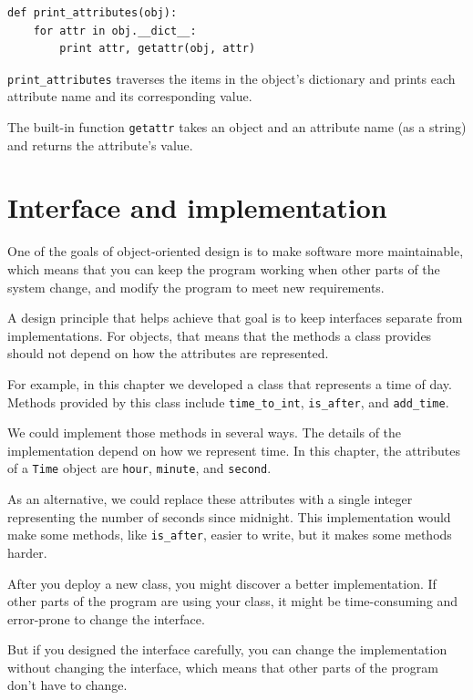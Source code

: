 \documentclass[10pt]{book}
\begin{document}
\begin{verbatim}
def print_attributes(obj):
    for attr in obj.__dict__:
        print attr, getattr(obj, attr)
\end{verbatim}
%
\verb"print_attributes" traverses the items in the object's dictionary
and prints each attribute name and its corresponding value.

The built-in function {\tt getattr} takes an object and an attribute
name (as a string) and returns the attribute's value.


\section{Interface and implementation}

One of the goals of object-oriented design is to make software more
maintainable, which means that you can keep the program working when
other parts of the system change, and modify the program to meet new
requirements.

A design principle that helps achieve that goal is to keep
interfaces separate from implementations.  For objects, that means
that the methods a class provides should not depend on how the
attributes are represented.

For example, in this chapter we developed a class that represents
a time of day.  Methods provided by this class include
\verb"time_to_int", \verb"is_after", and \verb"add_time".

We could implement those methods in several ways.  The details of the
implementation depend on how we represent time.  In this chapter, the
attributes of a {\tt Time} object are {\tt hour}, {\tt minute}, and
{\tt second}.

As an alternative, we could replace these attributes with
a single integer representing the number of seconds
since midnight.  This implementation would make some methods,
like \verb"is_after", easier to write, but it makes some methods
harder.

After you deploy a new class, you might discover a better
implementation.  If other parts of the program are using your
class, it might be time-consuming and error-prone to change the
interface.

But if you designed the interface carefully, you can
change the implementation without changing the interface, which
means that other parts of the program don't have to change.
\end{document}
